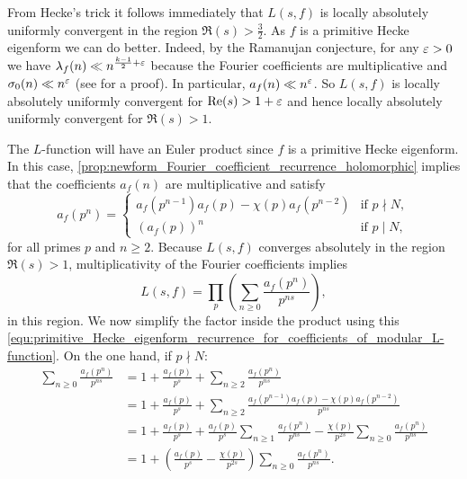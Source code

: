       From Hecke's trick it follows immediately that $L(s,f)$ is locally absolutely uniformly convergent in the region $\Re(s) > \frac{3}{2}$. As $f$ is a primitive Hecke eigenform we can do better. Indeed, by the Ramanujan conjecture, for any $\varepsilon > 0$ we have $\lambda_{f}(n) \ll n^{\frac{k-1}{2}+\varepsilon}$ because the Fourier coefficients are multiplicative and $\sigma_{0}(n) \ll n^{\varepsilon}$ (see \cite{montgomery2006multiplicative} for a proof). In particular, $a_{f}(n) \ll n^{\varepsilon}$. So $L(s,f)$ is locally absolutely uniformly convergent for $\mathrm{Re}(s) > 1+\varepsilon$ and hence locally absolutely uniformly convergent for $\Re(s) > 1$.

      The $L$-function will have an Euler product since $f$ is a primitive Hecke eigenform. In this case, \cref{prop:newform_Fourier_coefficient_recurrence_holomorphic} implies that the coefficients $a_{f}(n)$ are multiplicative and satisfy
      \begin{equation}\label{equ:primitive_Hecke_eigenform_recurrence_for_coefficients_of_modular_L-function}
        a_{f}(p^{n}) = \begin{cases} a_{f}(p^{n-1})a_{f}(p)-\chi(p)a_{f}(p^{n-2}) & \text{if $p \nmid N$}, \\ (a_{f}(p))^{n} & \text{if $p \mid N$}, \end{cases}
      \end{equation}
      for all primes $p$ and $n \ge 2$. Because $L(s,f)$ converges absolutely in the region $\Re(s) > 1$, multiplicativity of the Fourier coefficients implies
      \[
        L(s,f) = \prod_{p}\left(\sum_{n \ge 0}\frac{a_{f}(p^{n})}{p^{ns}}\right),
      \]
      in this region. We now simplify the factor inside the product using this \cref{equ:primitive_Hecke_eigenform_recurrence_for_coefficients_of_modular_L-function}. On the one hand, if $p \nmid N$:
      \begin{align*}
        \sum_{n \ge 0}\frac{a_{f}(p^{n})}{p^{ns}} &= 1+\frac{a_{f}(p)}{p^{s}}+\sum_{n \ge 2}\frac{a_{f}(p^{n})}{p^{ns}} \\
        &= 1+\frac{a_{f}(p)}{p^{s}}+\sum_{n \ge 2}\frac{a_{f}(p^{n-1})a_{f}(p)-\chi(p)a_{f}(p^{n-2})}{p^{ns}} \\
        &= 1+\frac{a_{f}(p)}{p^{s}}+\frac{a_{f}(p)}{p^{s}}\sum_{n \ge 1}\frac{a_{f}(p^{n})}{p^{ns}}-\frac{\chi(p)}{p^{2s}}\sum_{n \ge 0}\frac{a_{f}(p^{n})}{p^{ns}} \\
        &= 1+\left(\frac{a_{f}(p)}{p^{s}}-\frac{\chi(p)}{p^{2s}}\right)\sum_{n \ge 0}\frac{a_{f}(p^{n})}{p^{ns}}.
      \end{align*}
